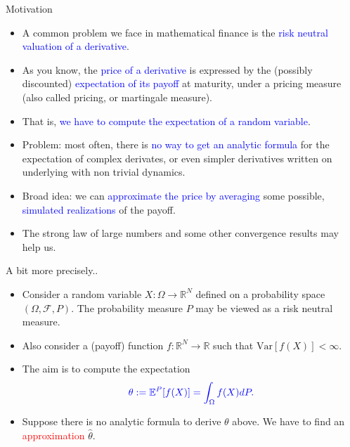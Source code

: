 \documentclass[9 pt]{beamer} %
\def \blue {\textcolor{blue}}
\def \red {\textcolor{red}}
\def \F {\mathcal{F}}
\def \bE {\mathbb{E}}
\begin{document}
 \begin{frame}{Motivation}
\begin{itemize}
\item A common problem we face in mathematical finance is the \blue{risk neutral valuation of a derivative}.
\item As you know, the \blue{price of a derivative} is expressed by the (possibly discounted) \blue{expectation of its payoff} at maturity, under a pricing measure (also called pricing, or martingale measure).
\item That is, \blue{we have to compute the expectation of a random variable}.
\item Problem: most often, there is \blue{no way to get an analytic formula} for the expectation of complex derivates, or even simpler derivatives written on underlying with non trivial dynamics. 
\item Broad idea: we can \blue{approximate the price by averaging} some possible, \blue{simulated realizations}  of the payoff.
\item The strong law of large numbers and some other convergence results may help us.
\end{itemize}
\end{frame}

    
 \begin{frame}{A bit more precisely..}
\begin{itemize}
\item Consider a random variable $X: \Omega \to \mathbb{R}^N$ defined on a probability space $(\Omega, \F, P)$. The probability measure $P$ may be viewed as a risk neutral measure.
\item Also consider a (payoff) function $f: \mathbb{R}^N \to \mathbb{R}$ such that $\text{Var}[f(X)] < \infty$. 
\item The aim is to compute the expectation
$$
\blue{\theta := \bE^P[f(X)] = \int_{\Omega}f(X)dP.}
$$
\item Suppose there is no analytic formula to derive $\theta$ above. We have to find an \red{approximation} $\hat \theta$.
\end{itemize}
\end{frame}  
\end{document}
